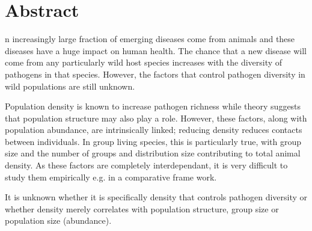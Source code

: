 




\begin{knitrout}
\color{fgcolor}\begin{kframe}


{\ttfamily\noindent\bfseries\color{errorcolor}{\#\# Error in library(extrafont): there is no package called 'extrafont'}}

{\ttfamily\noindent\bfseries\color{errorcolor}{\#\# Error in as.vector(y): object 'theme\_tcdl' not found}}\end{kframe}
\end{knitrout}





\section{Abstract}


n increasingly large fraction of emerging diseases come from animals \cite{jones2008global, taylor2001risk} and these diseases have a huge impact on human health.
The chance that a new disease will come from any particularly wild host species increases with the diversity of pathogens in that species.
However, the factors that control pathogen diversity in wild populations are still unknown.



Population density is known to increase pathogen richness while theory suggests that population structure may also play a role.
However, these factors, along with population abundance, are intrinsically linked; reducing density reduces contacts between individuals.
In group living species, this is particularly true, with group size and the number of groups and distribution size contributing to total animal density. 
As these factors are completely interdependant, it is very difficult to study them empirically e.g. in a comparative frame work.


It is unknown whether it is specifically density that controls pathogen diversity or whether density merely correlates with population structure, group size or population size (abundance).


